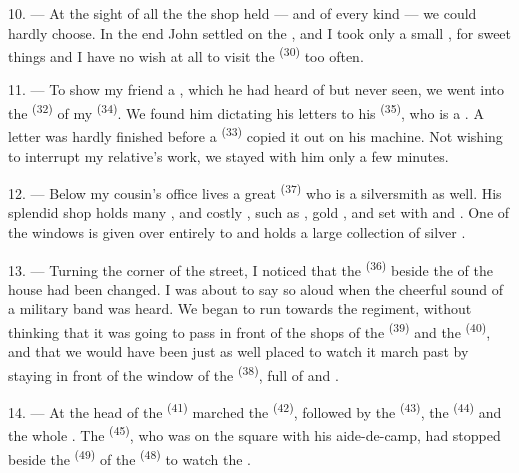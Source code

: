 10. --- At the sight of all the  the shop held ---
 and  of every kind --- we
could hardly choose. In the end John settled on the ,
and I took only a small , for sweet things
 and I have no wish at all to visit the
 \textsuperscript{(30)} too often.

\VUsaut{3.0mm}

11. --- To show my friend a , which he had heard of but
never seen, we went into the  \textsuperscript{(32)} of my
 \textsuperscript{(34)}. We found him dictating his letters to his 
\textsuperscript{(35)}, who is a . A letter was hardly finished
before a  \textsuperscript{(33)} copied it out on his machine. Not wishing
to interrupt my relative's work, we stayed with him only a few minutes.

12. --- Below my cousin's office lives a great
 \textsuperscript{(37)} who is a silversmith as well.
His splendid shop holds many ,
 and costly , such as ,
gold ,  and  set with
 and . One of the windows is given
over entirely to  and holds a large collection of silver
.

13. --- Turning the corner of the street, I noticed that the
 \textsuperscript{(36)} beside the  of the house had been
changed. I was about to say so aloud when the cheerful sound of a military
band was heard. We began to run towards the regiment, without thinking
that it was going to pass in front of the shops of the 
\textsuperscript{(39)} and the  \textsuperscript{(40)}, and that we would have
been just as well placed to watch it march past by staying in front of
the window of the  \textsuperscript{(38)}, full of  and .

\VUsaut{3.0mm}

14. --- At the head of the  \textsuperscript{(41)} marched the
 \textsuperscript{(42)}, followed by the 
\textsuperscript{(43)}, the  \textsuperscript{(44)} and the whole . The
 \textsuperscript{(45)}, who was on the square with his aide-de-camp, had
stopped beside the  \textsuperscript{(49)} of the
 \textsuperscript{(48)} to watch the .

